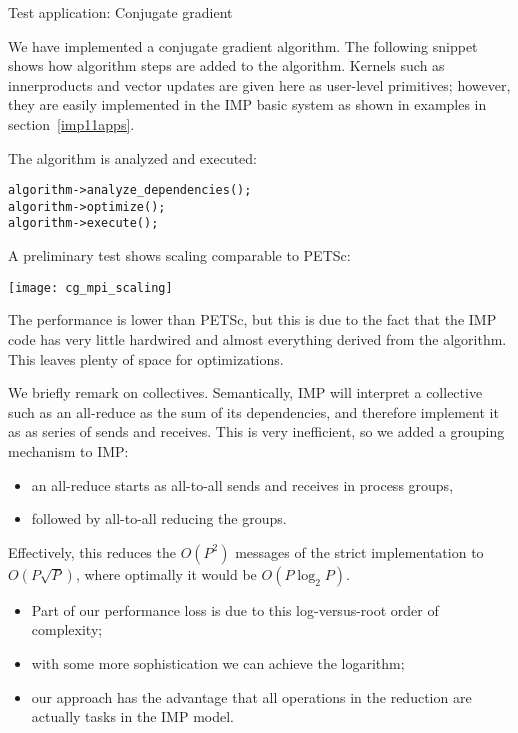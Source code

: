  {Test application: Conjugate gradient}

We have implemented a conjugate gradient algorithm. The following snippet shows how
algorithm steps are added to the algorithm. Kernels such as innerproducts and vector updates
are given here as user-level primitives; however, they are easily implemented in the \ac{IMP}
basic system as shown in examples in section~\ref{imp11apps}.
%

The algorithm is analyzed and executed:
\begin{verbatim}
algorithm->analyze_dependencies();
algorithm->optimize();
algorithm->execute();
\end{verbatim}

A preliminary test shows scaling comparable to PETSc:

\texttt{[image: cg\_mpi\_scaling]}

The performance is lower than PETSc, but this is due to the fact that
the \ac{IMP} code has very little hardwired and almost everything
derived from the algorithm. This leaves plenty of space for optimizations.

We briefly remark on collectives. Semantically, IMP will interpret a collective such
as an all-reduce as the sum of its dependencies, and therefore implement it as
as series of sends and receives. This is very inefficient, so we added a grouping
mechanism to \ac{IMP}: 
\begin{itemize}
\item an all-reduce starts as all-to-all sends and receives in process groups,
\item followed by all-to-all reducing the groups.
\end{itemize}
Effectively, this reduces the $O(P^2)$ messages of the strict implementation
to $O(P\sqrt P)$, where optimally it would be $O(P\log_2 P)$.
\begin{itemize}
\item Part of our performance loss is due to this log-versus-root order of complexity;
\item with some more sophistication we can achieve the logarithm;
\item our approach has the advantage that all operations in the reduction
  are actually tasks in the \ac{IMP} model.
\end{itemize}
